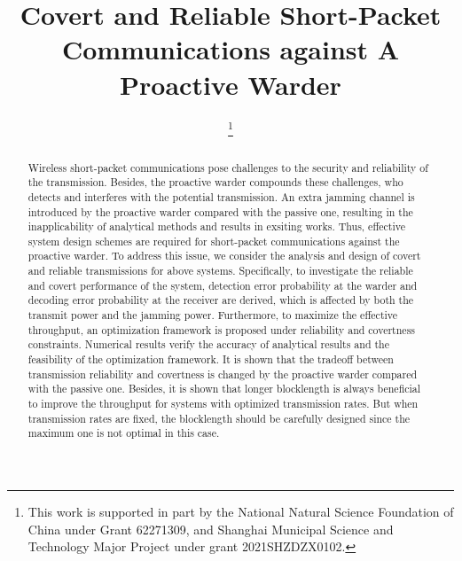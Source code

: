 \documentclass[conference]{IEEEtran}
\begin{document}
\title{Covert and Reliable Short-Packet Communications against A Proactive Warder}

\author{

\thanks{This work is supported in part by the National Natural Science Foundation of China under Grant 62271309, and Shanghai Municipal Science and Technology Major Project under grant 2021SHZDZX0102.}

}

\maketitle

\begin{abstract}
Wireless short-packet communications pose challenges to the security and reliability of the transmission. Besides, the proactive warder compounds these challenges, who detects and interferes with the potential transmission. An extra jamming channel is introduced by the proactive warder compared with the passive one, resulting in the inapplicability of analytical methods and results in exsiting works. Thus, effective system design schemes are required for short-packet communications against the proactive warder. To address this issue, we consider the analysis and design of covert and reliable transmissions for above systems. Specifically, to investigate the reliable and covert performance of the system, detection error probability at the warder and decoding error probability at the receiver are derived, which is affected by both the transmit power and the jamming power. Furthermore, to maximize the effective throughput, an optimization framework is proposed under reliability and covertness constraints. Numerical results verify the accuracy of analytical results and the feasibility of the optimization framework. It is shown that the tradeoff between transmission reliability and covertness is changed by the proactive warder compared with the passive one. Besides, it is shown that longer blocklength is always beneficial to improve the throughput for systems with optimized transmission rates. But when transmission rates are fixed, the blocklength should be carefully designed since the maximum one is not optimal in this case.
\end{abstract}
\end{document}
